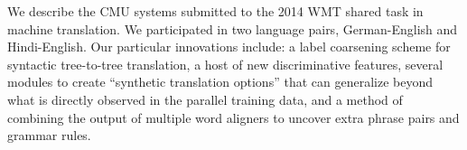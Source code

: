 We describe the CMU systems submitted to the 2014 WMT shared task in machine translation. We participated in two language pairs, German-English and Hindi-English. Our particular innovations include: a label coarsening scheme for syntactic tree-to-tree translation, a host of new discriminative features, several modules to create ``synthetic translation options'' that can generalize beyond what is directly observed in the parallel training data, and a method of combining the output of multiple word aligners to uncover extra phrase pairs and grammar rules.
